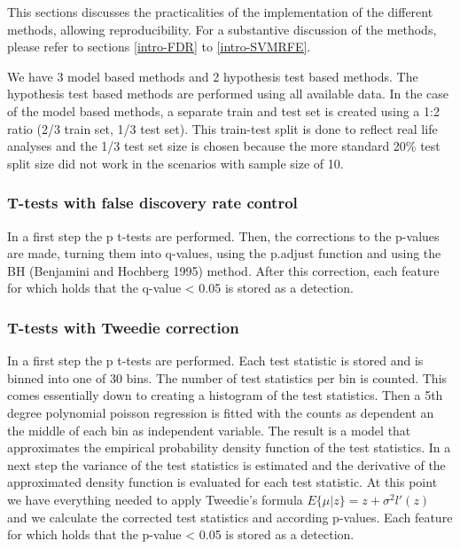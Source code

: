 \documentclass[
]{article}
\begin{document}
This sections discusses the practicalities of the implementation of the different methods, allowing reproducibility. For a substantive discussion of the methods, please refer to sections \ref{intro-FDR} to \ref{intro-SVMRFE}.

We have 3 model based methods and 2 hypothesis test based methods. The hypothesis test based methods are performed using all available data. In the case of the model based methods, a separate train and test set is created using a 1:2 ratio (2/3 train set, 1/3 test set). This train-test split is done to reflect real life analyses and the 1/3 test set size is chosen because the more standard 20\% test split size did not work in the scenarios with sample size of 10.

\hypertarget{t-tests-with-false-discovery-rate-control}{%
\subsubsection{T-tests with false discovery rate control}\label{t-tests-with-false-discovery-rate-control}}

In a first step the p t-tests are performed. Then, the corrections to the p-values are made, turning them into q-values, using the p.adjust function and using the BH (Benjamini and Hochberg 1995) method. After this correction, each feature for which holds that the q-value \textless{} 0.05 is stored as a detection.

\hypertarget{t-tests-with-tweedie-correction}{%
\subsubsection{T-tests with Tweedie correction}\label{t-tests-with-tweedie-correction}}

In a first step the p t-tests are performed. Each test statistic is stored and is binned into one of 30 bins. The number of test statistics per bin is counted. This comes essentially down to creating a histogram of the test statistics. Then a 5th degree polynomial poisson regression is fitted with the counts as dependent an the middle of each bin as independent variable. The result is a model that approximates the empirical probability density function of the test statistics. In a next step the variance of the test statistics is estimated and the derivative of the approximated density function is evaluated for each test statistic. At this point we have everything needed to apply Tweedie's formula \(E\{\mu|z\} = z + \sigma^2l'(z)\) and we calculate the corrected test statistics and according p-values. Each feature for which holds that the p-value \textless{} 0.05 is stored as a detection.
\end{document}

